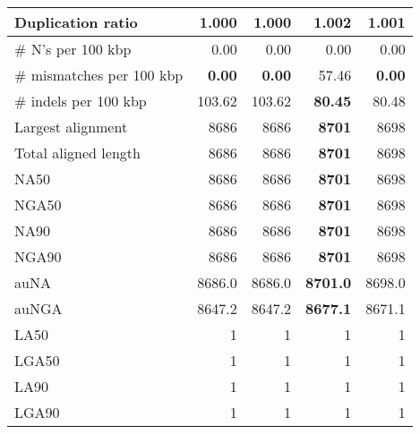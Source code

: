 \documentclass[12pt,a4paper]{article}
\begin{document}
\begin{table}[ht]
\begin{center}
\begin{tabular}{|l*{4}{|r}|}
Duplication ratio & {\bf 1.000} & {\bf 1.000} & 1.002 & 1.001 \\ \hline
\# N's per 100 kbp & 0.00 & 0.00 & 0.00 & 0.00 \\ \hline
\# mismatches per 100 kbp & {\bf 0.00} & {\bf 0.00} & 57.46 & {\bf 0.00} \\ \hline
\# indels per 100 kbp & 103.62 & 103.62 & {\bf 80.45} & 80.48 \\ \hline
Largest alignment & 8686 & 8686 & {\bf 8701} & 8698 \\ \hline
Total aligned length & 8686 & 8686 & {\bf 8701} & 8698 \\ \hline
NA50 & 8686 & 8686 & {\bf 8701} & 8698 \\ \hline
NGA50 & 8686 & 8686 & {\bf 8701} & 8698 \\ \hline
NA90 & 8686 & 8686 & {\bf 8701} & 8698 \\ \hline
NGA90 & 8686 & 8686 & {\bf 8701} & 8698 \\ \hline
auNA & 8686.0 & 8686.0 & {\bf 8701.0} & 8698.0 \\ \hline
auNGA & 8647.2 & 8647.2 & {\bf 8677.1} & 8671.1 \\ \hline
LA50 & 1 & 1 & 1 & 1 \\ \hline
LGA50 & 1 & 1 & 1 & 1 \\ \hline
LA90 & 1 & 1 & 1 & 1 \\ \hline
LGA90 & 1 & 1 & 1 & 1 \\ \hline
\end{tabular}
\end{center}
\end{table}
\end{document}
